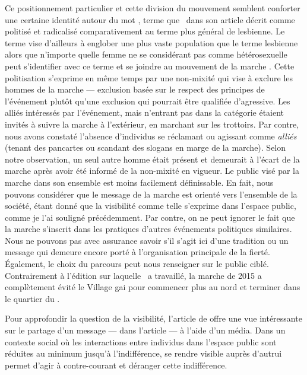 Ce positionnement particulier et cette division du mouvement semblent conforter une certaine identité autour du mot \dyke{}, terme que~\citet{Podmore2015a} dans son article  décrit comme politisé et radicalisé comparativement au terme plus général de lesbienne.
Le terme \dyke{} vise d'ailleurs à englober une plus vaste population que le terme lesbienne alors que n'importe quelle femme ne se considérant pas comme hétérosexuelle peut s'identifier avec ce terme et se joindre au mouvement de la marche \dyke{}.
Cette politisation s'exprime en même temps par une non-mixité qui vise à exclure les hommes de la marche --- exclusion basée sur le respect des principes de l'événement plutôt qu'une exclusion qui pourrait être qualifiée d'agressive.
Les alliés intéressés par l'événement, mais n'entrant pas dans la catégorie \dyke{} étaient invités à suivre la marche à l'extérieur, en marchant sur les trottoirs.
Par contre, nous avons constaté l'absence d'individus se réclamant ou agissant comme \emph{alliés} (tenant des pancartes ou scandant des slogans en marge de la marche).
Selon notre observation, un seul autre homme était présent et demeurait à l'écart de la marche après avoir été informé de la non-mixité en vigueur.
Le public visé par la marche dans son ensemble est moins facilement définissable.
En fait, nous pouvons considérer que le message de la marche est orienté vers l'ensemble de la société, étant donné que la visibilité comme telle s'exprime dans l'espace public, comme je l'ai souligné précédemment.
Par contre, on ne peut ignorer le fait que la marche s'inscrit dans les pratiques d'autres événements politiques similaires.
Nous ne pouvons pas avec assurance savoir s'il s'agit ici d'une tradition ou un message qui demeure encore porté à l'organisation principale de la fierté.
Également, le choix du parcours peut nous renseigner sur le public ciblé.
Contrairement à l'édition sur laquelle~\citet{Podmore2015a} a travaillé, la marche de 2015 a complètement évité le Village gai pour commencer plus au nord et terminer dans le quartier du .

Pour approfondir la question de la visibilité, l'article de \citet{Frosh2006}  offre une vue intéressante sur le partage d'un message ---  dans l'article --- à l'aide d'un média.
Dans un contexte social où les interactions entre individus dans l'espace public sont réduites au minimum jusqu'à l'indifférence, se rendre visible auprès d'autrui permet d'agir à contre-courant et déranger cette indifférence.

